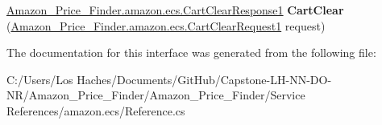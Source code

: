 \begin{DoxyCompactItemize}
\item 
\hypertarget{interface_amazon___price___finder_1_1amazon_1_1ecs_1_1_a_w_s_e_commerce_service_port_type_a3f366c04d67477233d5cd65e1557b0af}{\hyperlink{class_amazon___price___finder_1_1amazon_1_1ecs_1_1_cart_clear_response1}{Amazon\-\_\-\-Price\-\_\-\-Finder.\-amazon.\-ecs.\-Cart\-Clear\-Response1} {\bfseries Cart\-Clear} (\hyperlink{class_amazon___price___finder_1_1amazon_1_1ecs_1_1_cart_clear_request1}{Amazon\-\_\-\-Price\-\_\-\-Finder.\-amazon.\-ecs.\-Cart\-Clear\-Request1} request)}\label{interface_amazon___price___finder_1_1amazon_1_1ecs_1_1_a_w_s_e_commerce_service_port_type_a3f366c04d67477233d5cd65e1557b0af}

\end{DoxyCompactItemize}


The documentation for this interface was generated from the following file\-:\begin{DoxyCompactItemize}
\item 
C\-:/\-Users/\-Los Haches/\-Documents/\-Git\-Hub/\-Capstone-\/\-L\-H-\/\-N\-N-\/\-D\-O-\/\-N\-R/\-Amazon\-\_\-\-Price\-\_\-\-Finder/\-Amazon\-\_\-\-Price\-\_\-\-Finder/\-Service References/amazon.\-ecs/Reference.\-cs\end{DoxyCompactItemize}
